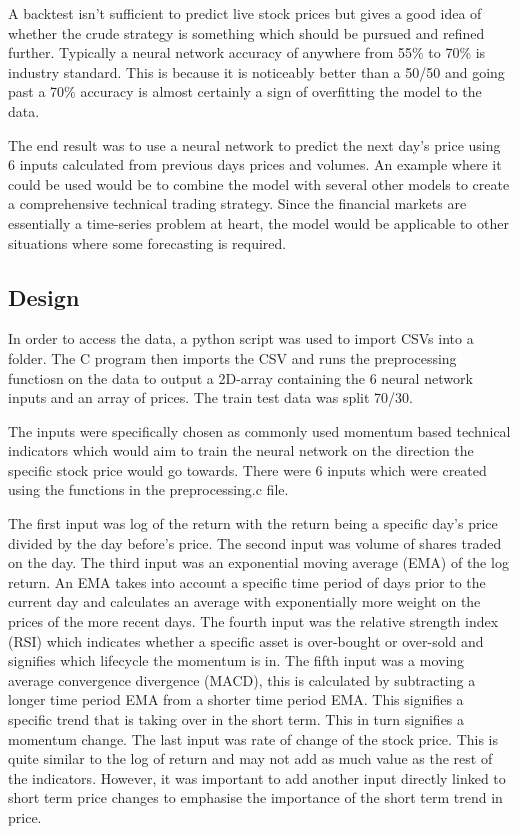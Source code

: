 \documentclass[11pt]{article}
\begin{document}
A backtest isn't sufficient to predict live stock prices but gives a good idea of whether the crude strategy is something which should be pursued and refined further. Typically a neural network accuracy of anywhere from 55\% to 70\% is industry standard. This is because it is noticeably better than a 50/50 and going past a 70\% accuracy is almost certainly a sign of overfitting the model to the data. 

The end result was to use a neural network to predict the next day's price using 6 inputs calculated from previous days prices and volumes. An example where it could be used would be to combine the model with several other models to create a comprehensive technical trading strategy. Since the financial markets are essentially a time-series problem at heart, the model would be applicable to other situations where some forecasting is required. 

\subsection{Design}
In order to access the data, a python script was used to import CSVs into a folder. The C program then imports the CSV and runs the preprocessing functiosn on the data to output a 2D-array containing the 6 neural network inputs and an array of prices. The train test data was split 70/30.

The inputs were specifically chosen as commonly used momentum based technical indicators which would aim to train the neural network on the direction the specific stock price would go towards. There were 6 inputs which were created using the functions in the preprocessing.c file. 

The first input was log of the return with the return being a specific day's price divided by the day before's price. The second input was volume of shares traded on the day. The third input was an exponential moving average (EMA) of the log return. An EMA takes into account a specific time period of days prior to the current day and calculates an average with exponentially more weight on the prices of the more recent days. The fourth input was the relative strength index (RSI) which indicates whether a specific asset is over-bought or over-sold and signifies which lifecycle the momentum is in. The fifth input was a moving average convergence divergence (MACD), this is calculated by subtracting a longer time period EMA from a shorter time period EMA. This signifies a specific trend that is taking over in the short term. This in turn signifies a momentum change. The last input was rate of change of the stock price. This is quite similar to the log of return and may not add as much value as the rest of the indicators. However, it was important to add another input directly linked to short term price changes to emphasise the importance of the short term trend in price.
\end{document}
